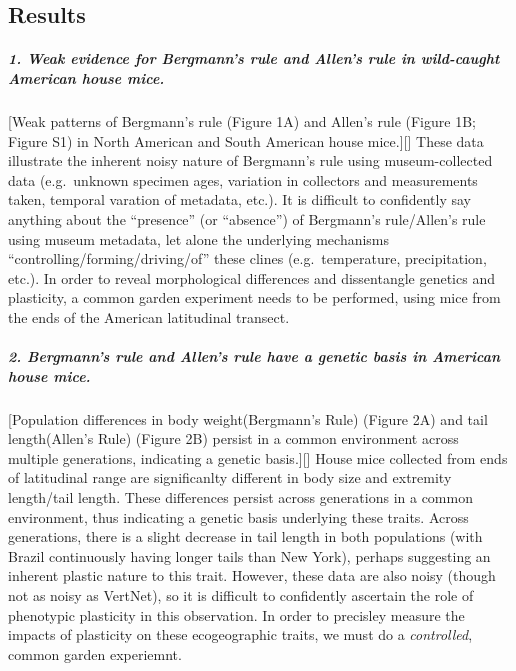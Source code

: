 \documentclass[]{article}
\let\oldsubparagraph\subparagraph
\renewcommand{\subparagraph}[1]{\oldsubparagraph{#1}\mbox{}}
\begin{document}
\newpage

\hypertarget{results}{%
\subsection{Results}\label{results}}

\hypertarget{weak-evidence-for-bergmanns-rule-and-allens-rule-in-wild-caught-american-house-mice.}{%
\subparagraph{\texorpdfstring{\textbf{1. Weak evidence for Bergmann's
rule and Allen's rule in wild-caught American house
mice.}}{1. Weak evidence for Bergmann's rule and Allen's rule in wild-caught American house mice.}}\label{weak-evidence-for-bergmanns-rule-and-allens-rule-in-wild-caught-american-house-mice.}}

{[}Weak patterns of Bergmann's rule (Figure 1A) and Allen's rule (Figure
1B; Figure S1) in North American and South American house mice.{]}{[}{]}
These data illustrate the inherent noisy nature of Bergmann's rule using
museum-collected data (e.g.~unknown specimen ages, variation in
collectors and measurements taken, temporal varation of metadata, etc.).
It is difficult to confidently say anything about the ``presence'' (or
``absence'') of Bergmann's rule/Allen's rule using museum metadata, let
alone the underlying mechanisms ``controlling/forming/driving/of'' these
clines (e.g.~temperature, precipitation, etc.). In order to reveal
morphological differences and dissentangle genetics and plasticity, a
common garden experiment needs to be performed, using mice from the ends
of the American latitudinal transect.

\hypertarget{bergmanns-rule-and-allens-rule-have-a-genetic-basis-in-american-house-mice.}{%
\subparagraph{\texorpdfstring{\textbf{2. Bergmann's rule and Allen's
rule have a genetic basis in American house
mice.}}{2. Bergmann's rule and Allen's rule have a genetic basis in American house mice.}}\label{bergmanns-rule-and-allens-rule-have-a-genetic-basis-in-american-house-mice.}}

{[}Population differences in body weight(Bergmann's Rule) (Figure 2A)
and tail length(Allen's Rule) (Figure 2B) persist in a common
environment across multiple generations, indicating a genetic
basis.{]}{[}{]} House mice collected from ends of latitudinal range are
significanlty different in body size and extremity length/tail length.
These differences persist across generations in a common environment,
thus indicating a genetic basis underlying these traits. Across
generations, there is a slight decrease in tail length in both
populations (with Brazil continuously having longer tails than New
York), perhaps suggesting an inherent plastic nature to this trait.
However, these data are also noisy (though not as noisy as VertNet), so
it is difficult to confidently ascertain the role of phenotypic
plasticity in this observation. In order to precisley measure the
impacts of plasticity on these ecogeographic traits, we must do a
\emph{controlled}, common garden experiemnt.
\end{document}
